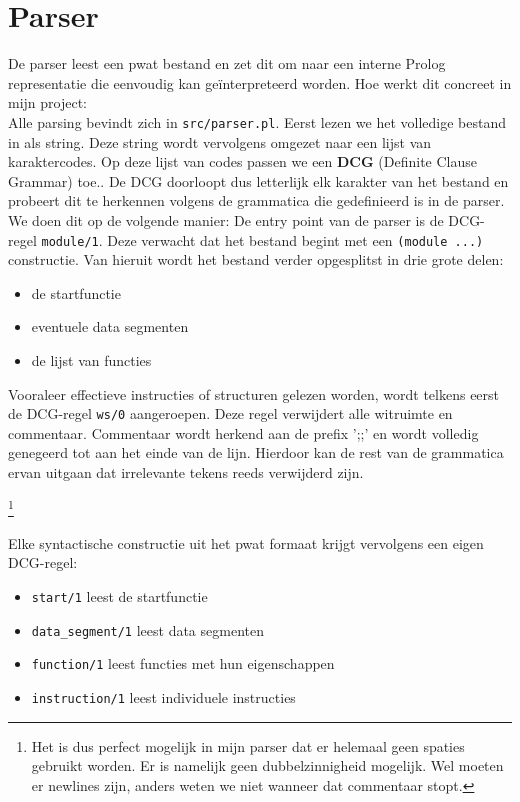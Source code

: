 \documentclass[a4paper,11pt]{article}
\begin{document}
\section{Parser}
De parser leest een pwat bestand en zet dit om naar een interne Prolog representatie die eenvoudig kan geïnterpreteerd worden.
Hoe werkt dit concreet in mijn project: \\

Alle parsing bevindt zich in \texttt{src/parser.pl}. Eerst lezen we het volledige bestand in als string.
Deze string wordt vervolgens omgezet naar een lijst van karaktercodes. Op deze lijst van codes passen we een \textbf{DCG} (Definite Clause Grammar)
toe.. De DCG doorloopt dus letterlijk elk karakter van het bestand en probeert dit te herkennen volgens de grammatica die gedefinieerd is in de parser.
We doen dit op de volgende manier:
De entry point van de parser is de DCG-regel \texttt{module/1}. Deze verwacht dat het bestand begint met een \texttt{(module ...)} constructie. Van hieruit wordt het bestand verder opgesplitst in drie grote delen:
\begin{itemize}
    \item de startfunctie
    \item eventuele data segmenten
    \item de lijst van functies
\end{itemize}

Vooraleer effectieve instructies of structuren gelezen worden, wordt telkens eerst de DCG-regel \texttt{ws/0} aangeroepen. Deze regel verwijdert alle witruimte en commentaar.
Commentaar wordt herkend aan de prefix ';;' en wordt volledig genegeerd tot aan het einde van de lijn.
Hierdoor kan de rest van de grammatica ervan uitgaan dat irrelevante tekens reeds verwijderd zijn.

\footnote{Het is dus perfect mogelijk in mijn parser dat er helemaal geen spaties gebruikt worden. Er is namelijk geen dubbelzinnigheid mogelijk. Wel moeten 
er newlines zijn, anders weten we niet wanneer dat commentaar stopt.}

Elke syntactische constructie uit het pwat formaat krijgt vervolgens een eigen DCG-regel:
\begin{itemize}
    \item \texttt{start/1} leest de startfunctie
    \item \texttt{data\_segment/1} leest data segmenten
    \item \texttt{function/1} leest functies met hun eigenschappen
    \item \texttt{instruction/1} leest individuele instructies
\end{itemize}
\end{document}
